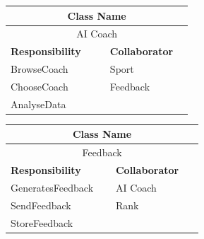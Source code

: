 \documentclass[a4paper]{article}
\begin{document}
	\noindent\begin{minipage}{\textwidth}
		\begin{minipage}[t]{0.48\textwidth}
	 	\centering
		\makeatletter{}\makeatother\caption*{}
		  	\begin{tabular}{|p{0.48\linewidth}|p{0.40\linewidth}|} 
	   			\hline
				\multicolumn{2}{|c|}{\textbf{Class Name}} \\
				\hline
				\multicolumn{2}{|c|}{AI Coach} \\
				\hline
				\textbf{Responsibility} & \textbf{Collaborator} \\
				\hline
				BrowseCoach & Sport\\
				ChooseCoach & Feedback \\
				AnalyseData &  \\
				\hline
	   		\end{tabular}
	 	\end{minipage}
	 	\begin{minipage}[t]{0.48\textwidth}
		\centering
		\makeatletter{}\makeatother\caption*{}
			\begin{tabular}{|p{0.48\linewidth}|p{0.40\linewidth}|} 
				\hline
				\multicolumn{2}{|c|}{\textbf{Class Name}} \\
				\hline
				\multicolumn{2}{|c|}{Feedback} \\
				\hline
				\textbf{Responsibility} & \textbf{Collaborator} \\
				\hline
				GeneratesFeedback & AI Coach \\
				SendFeedback & Rank\\
				StoreFeedback & \\
				\hline
			\end{tabular}
		\end{minipage}
   	\end{minipage}
\end{document}
